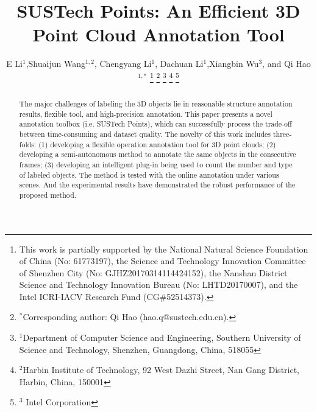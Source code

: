 \documentclass[letterpaper, 10 pt, conference]{ieeeconf}  %
\title{\LARGE \bf
SUSTech Points: An Efficient 3D Point Cloud Annotation Tool
}
\author{E Li$^{1}$,Shuaijun Wang$^{1,2}$,  Chengyang Li$^{1}$, Dachuan Li$^{1}$,Xiangbin Wu$^{3}$, and Qi Hao$^{1,*}$%
\thanks{This work is partially supported by the National Natural Science Foundation of China (No: 61773197), the Science and Technology Innovation Committee of Shenzhen City (No: GJHZ20170314114424152), the Nanshan District Science and Technology Innovation Bureau (No: LHTD20170007), and the Intel ICRI-IACV Research Fund (CG$\#$52514373).}
\thanks{$^{*}$Corresponding author: Qi Hao (hao.q@sustech.edu.cn).}
\thanks{$^{1}$Department of Computer Science and Engineering,
Southern University of Science and Technology, Shenzhen, Guangdong, China, 518055}
\thanks{$^{2}$Harbin Institute of Technology,
92 West Dazhi Street, Nan Gang District, Harbin, China, 150001}%
\thanks{$^{3}$ Intel Corporation}%
}
\begin{document}
\maketitle
\thispagestyle{empty}
\pagestyle{empty}
\begin{abstract}
The major challenges of labeling the 3D objects lie in reasonable structure annotation results, flexible tool, and high-precision annotation. This paper presents a novel annotation toolbox (i.e. SUSTech Points), which can successfully process the trade-off between time-consuming and dataset quality. The novelty of this work includes three-folds: (1) developing a flexible operation annotation tool for 3D point clouds; (2) developing a semi-autonomous method to annotate the same objects in the consecutive frames; (3) developing an intelligent plug-in being used to count the number and type of labeled objects. The method is tested with the online annotation under various scenes. And the experimental results have demonstrated the robust performance of the proposed method.
\end{abstract}


\end{document}
